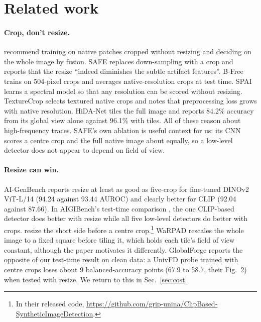 \documentclass[letterpaper]{article} %
\begin{document}
\section{Related work}
\label{sec:related}

\paragraph{Crop, don't resize.} \citet{corvi2023detection} recommend
training on native patches cropped without resizing and deciding on the whole
image by fusion. SAFE \cite{li2025safe} replaces
down-sampling with a crop and reports that the resize ``indeed diminishes the
subtle artifact features''. B-Free \cite{guillaro2025bfree} trains on
504-pixel crops and averages native-resolution crops at test time.
SPAI \cite{karageorgiou2025spai} learns a spectral model so that any
resolution can be scored without resizing. TextureCrop \cite{konstantinidou2025texturecrop}
selects textured native crops and notes that preprocessing loss grows with
native resolution. HiDA-Net \cite{mu2026hidanet} tiles the full image and
reports 84.2\% accuracy from its global view alone against 96.1\% with tiles.
All of these reason about high-frequency traces. SAFE's own ablation is
useful context for us: its CNN scores a centre crop and the full native image
about equally, so a low-level detector does not appear to depend on field of
view.

\paragraph{Resize can win.} AI-GenBench \cite{pellegrini2025aigenbench}
reports resize at least as good as five-crop for fine-tuned DINOv2 ViT-L/14
(94.24 against 93.44 AUROC) and clearly better for CLIP (92.04 against 87.66).
In AIGIBench's test-time comparison \cite{li2025aigibench}, the one CLIP-based
detector does better with resize while all five low-level detectors do better
with crops. \citet{cozzolino2024raising} resize the short side
before a centre crop.\footnote{In their released code,
\url{https://github.com/grip-unina/ClipBased-SyntheticImageDetection}.} WaRPAD \cite{choi2025warpad} rescales the whole image to
a fixed square before tiling it, which holds each tile's field of view
constant, although the paper motivates it differently. GlobalForge \cite{cui2026globalforge}
reports the opposite of our test-time result on clean data: a UnivFD probe
trained with centre crops loses about 9 balanced-accuracy points (67.9 to
58.7, their Fig.~2) when tested with resize. We return to this in Sec.~\ref{sec:cost}.
\end{document}
